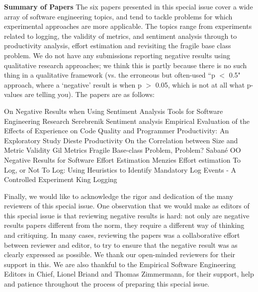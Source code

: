 \documentclass{svjour3}                     %
\begin{document}
\noindent\textbf{Summary of Papers} The six papers presented in this special issue cover a wide array of software engineering topics, and tend to tackle problems for which experimental approaches are more applicable. The topics range from experiments related to logging, the validity of metrics, and sentiment analysis through to productivity analysis, effort estimation and revisiting the fragile base class problem. We do not have any submissions reporting negative results using qualitative research approaches; we think this is partly because there is no such thing in a qualitative framework (vs. the erroneous but often-used ``p $<$ 0.5" approach, where a `negative' result is when p $>$ 0.05, which is not at all what p-values are telling you). The papers are as follows:

On Negative Results when Using Sentiment Analysis Tools for Software Engineering Research
Serebrenik
Sentiment analysis
Empirical Evaluation of the Effects of Experience on Code Quality and Programmer Productivity: An Exploratory Study
Dieste
Productivity
On the Correlation between Size and Metric Validity
Gil
Metrics
Fragile Base-class Problem, Problem?
Sabané
OO
Negative Results for Software Effort Estimation
Menzies
Effort estimation
To Log, or Not To Log: Using Heuristics to Identify Mandatory Log Events - A Controlled Experiment
King
Logging

Finally, we would like to acknowledge the rigor and dedication of the many reviewers of this special issue. One observation that we would make as editors of this special issue is that reviewing negative results is hard: not only are negative results papers different from the norm, they require a different way of thinking and critiquing. In many cases, reviewing the papers was a collaborative effort between reviewer and editor, to try to ensure that the negative result was as clearly expressed as possible. We thank our open-minded reviewers for their support in this. We are also thankful to the Empirical Software Engineering Editors in Chief, Lionel Briand and Thomas Zimmermann, for their support, help and patience throughout the process of preparing this special issue.
\end{document}
